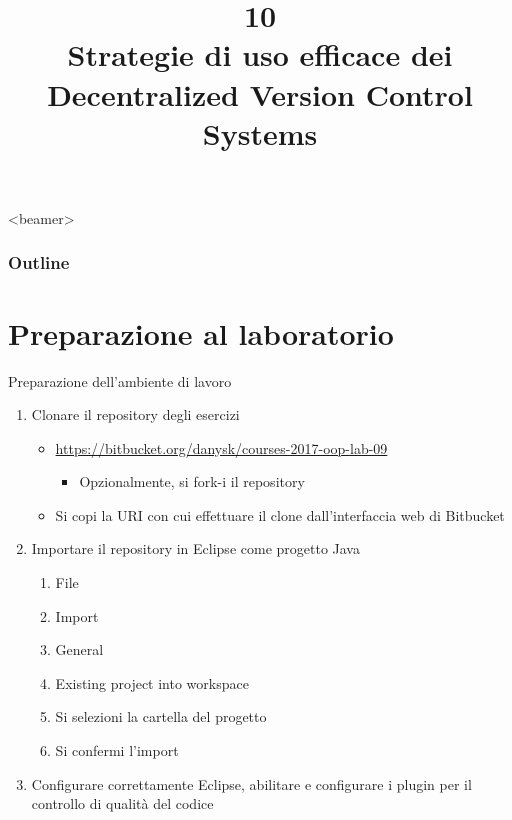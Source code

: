 \documentclass[presentation]{beamer}
\title[OOP10 -- DVCS Workflow]{10\\ Strategie di uso efficace dei \\ Decentralized Version Control Systems}
\begin{document}
\frame[label=coverpage]{\titlepage}

\begin{frame}<beamer>
 	\frametitle{Outline}
 	\tableofcontents[]
\end{frame}

\section{Preparazione al laboratorio}

\begin{frame}{Preparazione dell'ambiente di lavoro}
	\begin{enumerate}
		\item Clonare il repository degli esercizi
		\begin{itemize}
			\item \url{https://bitbucket.org/danysk/courses-2017-oop-lab-09}
			\begin{itemize}
				\item Opzionalmente, si fork-i il repository
			\end{itemize}
			\item Si copi la URI con cui effettuare il clone dall'interfaccia web di Bitbucket
		\end{itemize}
		\item Importare il repository in Eclipse come progetto Java
		\begin{enumerate}
			\item File
			\item Import
			\item General
			\item Existing project into workspace
			\item Si selezioni la cartella del progetto
			\item Si confermi l'import
		\end{enumerate}
		\item Configurare correttamente Eclipse, abilitare e configurare i plugin per il controllo di qualità del codice
	\end{enumerate}
\end{frame}
\end{document}
